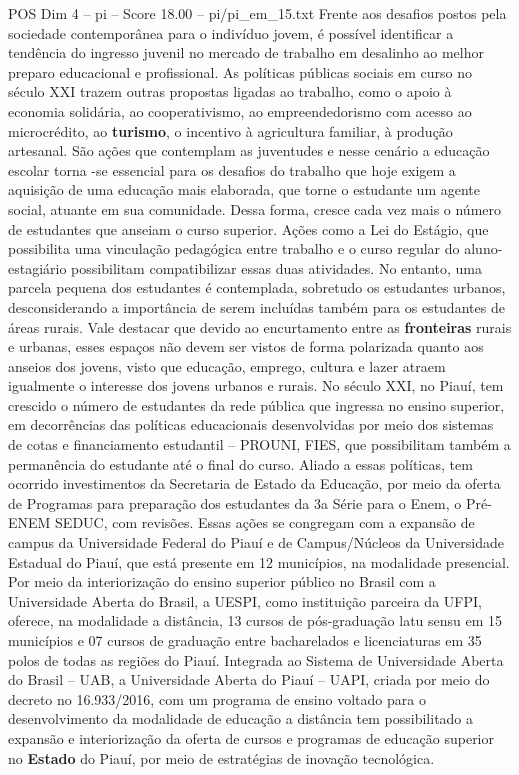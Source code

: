 \begin{textsample}{POS Dim 4 – pi – Score 18.00 – pi/pi\_em\_15.txt}
Frente aos desafios postos pela sociedade contemporânea para o indivíduo jovem, é possível identificar a tendência do ingresso juvenil no mercado de trabalho em desalinho ao melhor preparo educacional e profissional.
As políticas públicas sociais em curso no século XXI trazem outras propostas ligadas ao trabalho, como o apoio à economia solidária, ao cooperativismo, ao empreendedorismo com acesso ao microcrédito, ao \textbf{turismo}, o incentivo à agricultura familiar, à produção artesanal.
São ações que contemplam as juventudes e nesse cenário a educação escolar torna -se essencial para os desafios do trabalho que hoje exigem a aquisição de uma educação mais elaborada, que torne o estudante um agente social, atuante em sua comunidade.
Dessa forma, cresce cada vez mais o número de estudantes que anseiam o curso superior.
Ações como a Lei do Estágio, que possibilita uma vinculação pedagógica entre trabalho e o curso regular do aluno-estagiário possibilitam compatibilizar essas duas atividades.
No entanto, uma parcela pequena dos estudantes é contemplada, sobretudo os estudantes urbanos, desconsiderando a importância de serem incluídas também para os estudantes de áreas rurais.
Vale destacar que devido ao encurtamento entre as \textbf{fronteiras} rurais e urbanas, esses espaços não devem ser vistos de forma polarizada quanto aos anseios dos jovens, visto que educação, emprego, cultura e lazer atraem igualmente o interesse dos jovens urbanos e rurais.
No século XXI, no Piauí, tem crescido o número de estudantes da rede pública que ingressa no ensino superior, em decorrências das políticas educacionais desenvolvidas por meio dos sistemas de cotas e financiamento estudantil – PROUNI, FIES, que possibilitam também a permanência do estudante até o final do curso.
Aliado a essas políticas, tem ocorrido investimentos da Secretaria de Estado da Educação, por meio da oferta de Programas para preparação dos estudantes da 3a Série para o Enem, o Pré-ENEM SEDUC, com revisões.
Essas ações se congregam com a expansão de campus da Universidade Federal do Piauí e de Campus/Núcleos da Universidade Estadual do Piauí, que está presente em 12 municípios, na modalidade presencial.
Por meio da interiorização do ensino superior público no Brasil com a Universidade Aberta do Brasil, a UESPI, como instituição parceira da UFPI, oferece, na modalidade a distância, 13 cursos de pós-graduação latu sensu em 15 municípios e 07 cursos de graduação entre bacharelados e licenciaturas em 35 polos de todas as regiões do Piauí.
Integrada ao Sistema de Universidade Aberta do Brasil – UAB, a Universidade Aberta do Piauí – UAPI, criada por meio do decreto no 16.933/2016, com um programa de ensino voltado para o desenvolvimento da modalidade de educação a distância tem possibilitado a expansão e interiorização da oferta de cursos e programas de educação superior no \textbf{Estado} do Piauí, por meio de estratégias de inovação tecnológica.

\end{textsample}

